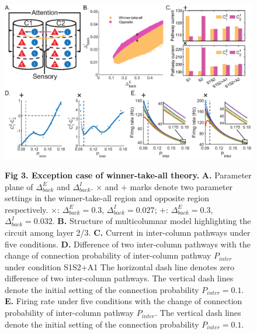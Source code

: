 \documentclass[10pt,letterpaper]{article}
\begin{document}
\begin{figure}[!h]
\begin{adjustwidth}{-2in}{0.3in} %
\centering
\includegraphics{Figure3.eps}
\begin{flushleft} {\bf Fig 3. Exception case of winner-take-all theory.}
\textbf{A.} Parameter plane of $\Delta_{back}^{E}$ and $\Delta_{back}^{I}$. $\times$ and $+$ marks denote two parameter settings in the winner-take-all region and opposite region respectively. $\times$: $\Delta_{back}^{E}=0.3$, $\Delta_{back}^{I}=0.027$; $+$: $\Delta_{back}^{E}=0.3$, $\Delta_{back}^{I}=0.032$. \textbf{B.} Structure of multicolumnar model highlighting the circuit among layer 2/3. \textbf{C.} Current in inter-column pathways under five conditions. \textbf{D.} Difference of two inter-column pathways with the change of connection probability of inter-column pathway $P_{inter}$ under condition S1S2+A1 The horizontal dash line denotes zero difference of two inter-column pathways. The vertical dash lines denote the initial setting of the connection probability $P_{inter}=0.1$. \textbf{E.} Firing rate under five conditions with the change of connection probability of inter-column pathway $P_{inter}$. The vertical dash lines denote the initial setting of the connection probability $P_{inter}=0.1$.
\end{flushleft}
\hypertarget{fig:fig3}{}
\end{adjustwidth}
\end{figure}
\end{document}
